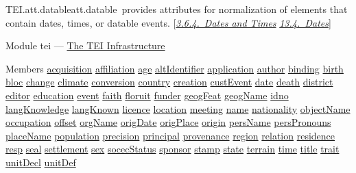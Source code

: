 \begin{reflist}
\item[]\begin{specHead}{TEI.att.datable}{att.datable} provides attributes for normalization of elements that contain dates, times, or datable events. [\textit{\hyperref[CONADA]{3.6.4.\ Dates and Times}} \textit{\hyperref[NDDATE]{13.4.\ Dates}}]\end{specHead} 
    \item[{Module}]
  tei — \hyperref[ST]{The TEI Infrastructure}
    \item[{Members}]
  \hyperref[TEI.acquisition]{acquisition} \hyperref[TEI.affiliation]{affiliation} \hyperref[TEI.age]{age} \hyperref[TEI.altIdentifier]{altIdentifier} \hyperref[TEI.application]{application} \hyperref[TEI.author]{author} \hyperref[TEI.binding]{binding} \hyperref[TEI.birth]{birth} \hyperref[TEI.bloc]{bloc} \hyperref[TEI.change]{change} \hyperref[TEI.climate]{climate} \hyperref[TEI.conversion]{conversion} \hyperref[TEI.country]{country} \hyperref[TEI.creation]{creation} \hyperref[TEI.custEvent]{custEvent} \hyperref[TEI.date]{date} \hyperref[TEI.death]{death} \hyperref[TEI.district]{district} \hyperref[TEI.editor]{editor} \hyperref[TEI.education]{education} \hyperref[TEI.event]{event} \hyperref[TEI.faith]{faith} \hyperref[TEI.floruit]{floruit} \hyperref[TEI.funder]{funder} \hyperref[TEI.geogFeat]{geogFeat} \hyperref[TEI.geogName]{geogName} \hyperref[TEI.idno]{idno} \hyperref[TEI.langKnowledge]{langKnowledge} \hyperref[TEI.langKnown]{langKnown} \hyperref[TEI.licence]{licence} \hyperref[TEI.location]{location} \hyperref[TEI.meeting]{meeting} \hyperref[TEI.name]{name} \hyperref[TEI.nationality]{nationality} \hyperref[TEI.objectName]{objectName} \hyperref[TEI.occupation]{occupation} \hyperref[TEI.offset]{offset} \hyperref[TEI.orgName]{orgName} \hyperref[TEI.origDate]{origDate} \hyperref[TEI.origPlace]{origPlace} \hyperref[TEI.origin]{origin} \hyperref[TEI.persName]{persName} \hyperref[TEI.persPronouns]{persPronouns} \hyperref[TEI.placeName]{placeName} \hyperref[TEI.population]{population} \hyperref[TEI.precision]{precision} \hyperref[TEI.principal]{principal} \hyperref[TEI.provenance]{provenance} \hyperref[TEI.region]{region} \hyperref[TEI.relation]{relation} \hyperref[TEI.residence]{residence} \hyperref[TEI.resp]{resp} \hyperref[TEI.seal]{seal} \hyperref[TEI.settlement]{settlement} \hyperref[TEI.sex]{sex} \hyperref[TEI.socecStatus]{socecStatus} \hyperref[TEI.sponsor]{sponsor} \hyperref[TEI.stamp]{stamp} \hyperref[TEI.state]{state} \hyperref[TEI.terrain]{terrain} \hyperref[TEI.time]{time} \hyperref[TEI.title]{title} \hyperref[TEI.trait]{trait} \hyperref[TEI.unitDecl]{unitDecl} \hyperref[TEI.unitDef]{unitDef}

\end{reflist}
